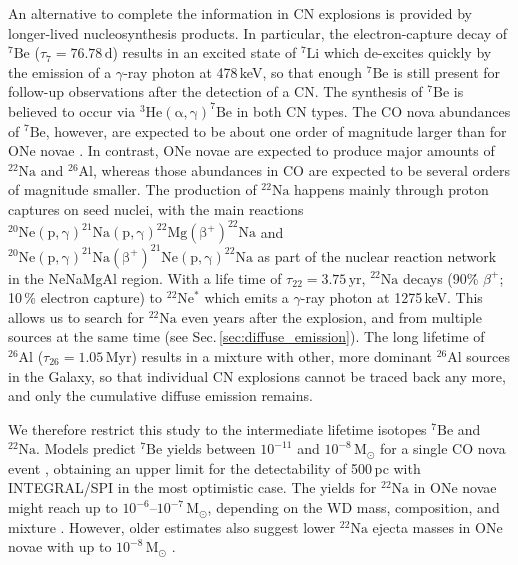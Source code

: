 \documentclass{aa}
\newcommand{\mrm}[1]{\mathrm{#1}}
\newcommand{\nuc}[2]{$\mrm{^{#2}#1}$}
\begin{document}
An alternative to complete the information in CN explosions is provided by longer-lived nucleosynthesis products.
%
In particular, the electron-capture decay of \nuc{Be}{7} ($\tau_7 = 76.78\,\mrm{d}$) results in an excited state of \nuc{Li}{7} which de-excites quickly by the emission of a $\gamma$-ray photon at 478\,keV, so that enough \nuc{Be}{7} is still present for follow-up observations after the detection of a CN.
%
The synthesis of \nuc{Be}{7} is believed to occur via $\mrm{^3He(\alpha,\gamma)^7Be}$ in both CN types.
%
The CO nova abundances of \nuc{Be}{7}, however, are expected to be about one order of magnitude larger than for ONe novae \citep{Jose1998_novae}.
%
In contrast, ONe novae are expected to produce major amounts of \nuc{Na}{22} and \nuc{Al}{26}, whereas those abundances in CO are expected to be several orders of magnitude smaller.
%
The production of \nuc{Na}{22} happens mainly through proton captures on seed nuclei, with the main reactions $\mrm{^{20}Ne(p,\gamma)^{21}Na(p,\gamma)^{22}Mg(\beta^+)^{22}Na}$ and $\mrm{^{20}Ne(p,\gamma)^{21}Na(\beta^+)^{21}Ne(p,\gamma)^{22}Na}$ as part of the nuclear reaction network in the NeNaMgAl region.
%
With a life time of $\tau_{22} = 3.75\,\mrm{yr}$, \nuc{Na}{22} decays (90\.\% $\beta^+$; 10\,\% electron capture) to \nuc{Ne^*}{22} which emits a $\gamma$-ray photon at 1275\,keV.
%
This allows us to search for \nuc{Na}{22} even years after the explosion, and from multiple sources at the same time (see Sec.\,\ref{sec:diffuse_emission}).
%
The long lifetime of \nuc{Al}{26} ($\tau_{26} = 1.05\,\mrm{Myr}$) results in a mixture with other, more dominant \nuc{Al}{26} sources in the Galaxy, so that individual CN explosions cannot be traced back any more, and only the cumulative diffuse emission remains.

We therefore restrict this study to the intermediate lifetime isotopes \nuc{Be}{7} and \nuc{Na}{22}.
%
Models predict \nuc{Be}{7} yields between $10^{-11}$ and $10^{-8}\,\mrm{M_\odot}$ for a single CO nova event \citep[e.g.,][]{Jose2001_novae_intermediate,Jose2001_novaegamma,Jose2006_novae,Hernanz2006_novae,abcdefgh,Hernanz2014_nova,Starrfield2020_COnovae}, obtaining an upper limit for the detectability of 500\,pc with INTEGRAL/SPI in the most optimistic case.
%
The yields for \nuc{Na}{22} in ONe novae might reach up to $10^{-6}$--$10^{-7}\,\mrm{M_\odot}$, depending on the WD mass, composition, and mixture \cite{abcdefgh}.
%
However, older estimates also suggest lower \nuc{Na}{22} ejecta masses in ONe novae with up to $10^{-8}\,\mrm{M_\odot}$ \citep[e.g.,][]{Jose1998_novae}.
\end{document}
